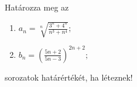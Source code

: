 \documentclass[11pt]{scrartcl}
\begin{document}
Határozza meg az
\begin{enumerate}
	\item \(\displaystyle
	      a_n = \sqrt[n]{\frac{3^n + 4^n}{n^3 + n^4}};
	      \)

	\item \(\displaystyle
	      b_n = \left(
	      \frac{5n + 2}{5n - 3}
	      \right)^{2n + 2};
	      \)
\end{enumerate}
sorozatok határértékét, ha léteznek!
\end{document}
